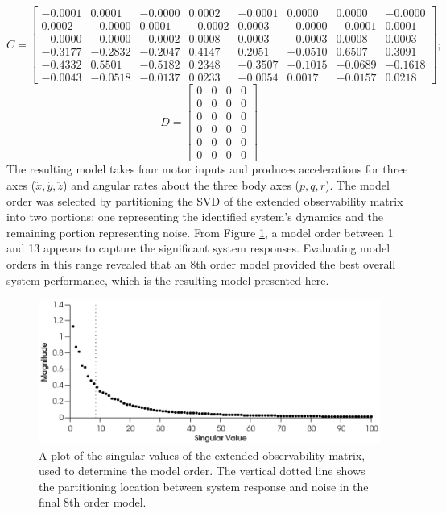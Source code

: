 \begin{equation*}
C = \begin{bmatrix}
-0.0001&0.0001&-0.0000&0.0002&-0.0001&0.0000&0.0000&-0.0000\\
0.0002&-0.0000&0.0001&-0.0002&0.0003&-0.0000&-0.0001&0.0001\\
-0.0000&-0.0000&-0.0002&0.0008&0.0003&-0.0003&0.0008&0.0003\\
-0.3177&-0.2832&-0.2047&0.4147&0.2051&-0.0510&0.6507&0.3091\\
-0.4332&0.5501&-0.5182&0.2348&-0.3507&-0.1015&-0.0689&-0.1618\\
-0.0043&-0.0518&-0.0137&0.0233&-0.0054&0.0017&-0.0157&0.0218
\end{bmatrix};
\end{equation*} 
\begin{equation*}
D = \begin{bmatrix}
0&0&0&0\\
0&0&0&0\\
0&0&0&0\\
0&0&0&0\\
0&0&0&0\\
0&0&0&0
\end{bmatrix}
\end{equation*}
\normalsize %
The resulting model takes four motor inputs and produces accelerations for three axes ($\ddot x, \ddot y, \ddot z$) and angular rates about the three body axes ($p, q, r$). The model order was selected by partitioning the SVD of the extended observability matrix into two portions: one representing the identified system's dynamics and the remaining portion representing noise. From Figure \ref{fig:5_singular_values}, a model order between 1 and 13 appears to capture the significant system responses. Evaluating model orders in this range revealed that an 8th order model provided the best overall system performance, which is the resulting model presented here. 
\begin{figure}[htb!]\label{fig:5_singular_values}
	\centering
	\includegraphics{../fig/singular_values_parsim.eps}
	\caption{A plot of the singular values of the extended observability matrix, used to determine the model order. The vertical dotted line shows the partitioning location between system response and noise in the final 8th order model.}
\end{figure}

